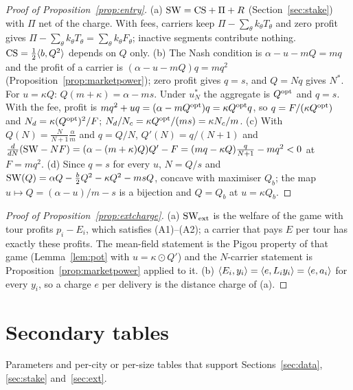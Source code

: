 \documentclass[preprint,11pt,authoryear]{elsarticle}
\theoremstyle{plain}
\theoremstyle{remark}
\begin{document}
\begin{proof}[Proof of Proposition~\ref{prop:entry}]
(a) $\mathrm{SW}=\mathrm{CS}+\Pi+R$ (Section~\ref{sec:stake}) with $\Pi$ net of the charge. With fees, carriers keep $\Pi-\sum_\theta k_\theta T_\theta$ and zero profit gives $\Pi-\sum_\theta k_\theta T_\theta=\sum_\theta k_\theta F_\theta$; inactive segments contribute nothing. $\mathrm{CS}=\tfrac12\langle b,Q^2\rangle$ depends on $Q$ only. (b) The Nash condition is $\alpha-u-mQ=mq$ and the profit of a carrier is $(\alpha-u-mQ)q=mq^2$ (Proposition~\ref{prop:marketpower}); zero profit gives $q=s$, and $Q=Nq$ gives $N^*$. For $u=\kappa Q$: $Q(m+\kappa)=\alpha-ms$. Under $u^*_N$ the aggregate is $Q^{\mathrm{opt}}$ and $q=s$. With the fee, profit is $mq^2+uq=(\alpha-mQ^{\mathrm{opt}})q=\kappa Q^{\mathrm{opt}} q$, so $q=F/(\kappa Q^{\mathrm{opt}})$ and $N_d=\kappa(Q^{\mathrm{opt}})^2/F$; $N_d/N_c=\kappa Q^{\mathrm{opt}}/(ms)=\kappa N_c/m$. (c) With $Q(N)=\frac N{N+1}\frac\alpha m$ and $q=Q/N$, $Q'(N)=q/(N+1)$ and $\frac{d}{dN}(\mathrm{SW}-NF)=(\alpha-(m+\kappa)Q)Q'-F=(mq-\kappa Q)\frac q{N+1}-mq^2<0$ at $F=mq^2$. (d) Since $q=s$ for every $u$, $N=Q/s$ and $\mathrm{SW}(Q)=\alpha Q-\tfrac b2Q^2-\kappa Q^2-msQ$, concave with maximiser $Q_b$; the map $u\mapsto Q=(\alpha-u)/m-s$ is a bijection and $Q=Q_b$ at $u=\kappa Q_b$.
\end{proof}

\begin{proof}[Proof of Proposition~\ref{prop:extcharge}]
(a) $\mathrm{SW}_{\rm ext}$ is the welfare of the game with tour profits $p_i-E_i$, which satisfies (A1)--(A2); a carrier that pays $E$ per tour has exactly these profits. The mean-field statement is the Pigou property of that game (Lemma~\ref{lem:pot} with $u=\kappa\odot Q'$) and the $N$-carrier statement is Proposition~\ref{prop:marketpower} applied to it. (b) $\langle E_i,y_i\rangle=\langle e,L_iy_i\rangle=\langle e,a_i\rangle$ for every $y_i$, so a charge $e$ per delivery is the distance charge of (a).
\end{proof}

\section{Secondary tables}\label{app:tables}
\setcounter{table}{0}
Parameters and per-city or per-size tables that support Sections~\ref{sec:data}, \ref{sec:stake} and~\ref{sec:ext}.

\begin{table}[!ht]
\centering\footnotesize\setlength{\tabcolsep}{3.5pt}
\caption{Replica study per city (amplitude 1, five seeds). $d$: active zone-hours; $\varrho=\max\kappa/m$; slope: log-log slope of $\norm{Q^\Nash-Q^\War}_m$ in $N$ for $N\ge24$, mean over seeds with 95\% $t$-interval; ratio: $\max_k|\Delta Q_k|/s_N$ with $s_N$ the largest Nash delivery of one carrier at one zone-hour, median and maximum over $N$ and seeds; PoA$-1$ in \% of optimal welfare at $N=6$ and in the limit; charge gap $\norm{u^*_\Nash-u^*_\War}_{\kappa^{-1}}/\norm{u^*_\War}_{\kappa^{-1}}$ at $N=6$ and $N=1536$.}\label{tab:cities}

\end{table}
\end{document}
